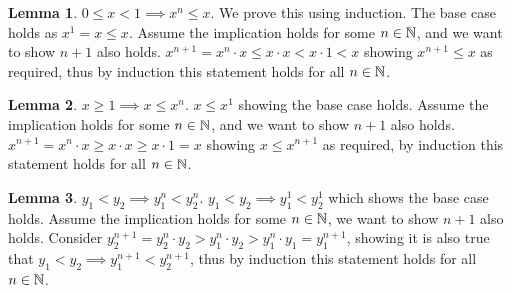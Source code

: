 \documentclass{homework}
\newcommand{\N}{\bb{N}} %
\newcommand{\?}{\stackrel{?}{=}}
\theoremstyle{definition}
\newtheorem*{lemma}{Lemma}
\begin{document}
\begin{lemma}
    \underline{$0\leq x<1\implies x^n\leq x$}. We prove this using induction. The base case holds as $x^1=x\leq x$. Assume the implication holds for some $n\in\N$, and we want to show $n+1$ also holds. $x^{n+1}=x^n\cdot x\leq x\cdot x < x\cdot 1<x$ showing $x^{n+1}\leq x$ as required, thus by induction this statement holds for all $n\in\N$. 
\end{lemma}

\begin{lemma}
    \underline{$x\geq1\implies x\leq x^n$}. $x\leq x^1$ showing the base case holds. Assume the implication holds for some $n\in\N$, and we want to show $n+1$ also holds. $x^{n+1}=x^n\cdot x\geq x\cdot x\geq x\cdot 1 = x$ showing $x\leq x^{n+1}$ as required, by induction this statement holds for all $n\in\N$. 
\end{lemma}

\begin{lemma}
    \underline{$y_1<y_2\implies y_1^n<y_2^n$}. $y_1<y_2\implies y_1^1<y_2^1$ which shows the base case holds. Assume the implication holds for some $n\in\N$, we want to show $n+1$ also holds. Consider $y_2^{n+1}=y_2^n\cdot y_2>y_1^n\cdot y_2> y_1^n\cdot y_1 = y_1^{n+1}$, showing it is also true that $y_1<y_2\implies y_1^{n+1}<y_2^{n+1}$, thus by induction this statement holds for all $n\in\N$. 
\end{lemma}
\end{document}
